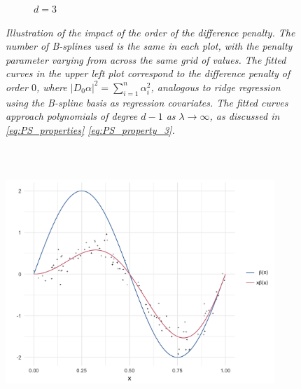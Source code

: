 \documentclass[12pt]{article}
\theoremstyle{definition}
\begin{document}
\begin{figure}[H]
\begin{subfigure}{.5\textwidth}
\caption{$d=3$}
\end{subfigure}
\caption{\textit{Illustration of the impact of the order of the difference penalty. The number of B-splines used is the same in each plot, with the penalty parameter varying from across the same grid of values. The fitted curves in the upper left plot correspond to the difference penalty of order $0$, where $\vert D_0 \alpha \vert^2 = \sum_{i=1}^n \alpha_i^2$, analogous to ridge regression using the B-spline basis as regression covariates. The fitted curves approach polynomials of degree $d-1$ as $\lambda \rightarrow \infty$, as discussed in \ref{eq:PS_properties} \ref{eq:PS_property_3}.}}
\label{fig:PS_penalty_section_figure_6}
\end{figure}




\begin{figure}[h]
\centering
 \graphicspath{{img/}}
  \includegraphics[width=4in, height=4in]{PS_penalty_section_figure_5.png}
\end{figure}




\end{document}

